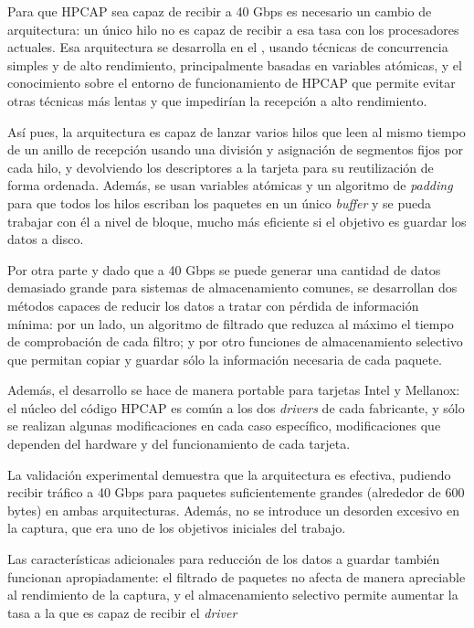 \documentclass[twoside, 12pt, draft]{epstfg}
\begin{document}
Para que HPCAP sea capaz de recibir a 40 Gbps es necesario un cambio de arquitectura: un único hilo no es capaz de recibir a esa tasa con los procesadores actuales. Esa arquitectura se desarrolla en el , usando técnicas de concurrencia simples y de alto rendimiento, principalmente basadas en variables atómicas, y el conocimiento sobre el entorno de funcionamiento de HPCAP que permite evitar otras técnicas más lentas y que impedirían la recepción a alto rendimiento.

Así pues, la arquitectura es capaz de lanzar varios hilos que leen al mismo tiempo de un anillo de recepción usando una división y asignación de segmentos fijos por cada hilo, y devolviendo los descriptores a la tarjeta para su reutilización de forma ordenada. Además, se usan variables atómicas y un algoritmo de \textit{padding} para que todos los hilos escriban los paquetes en un único \textit{buffer} y se pueda trabajar con él a nivel de bloque, mucho más eficiente si el objetivo es guardar los datos a disco.

Por otra parte y dado que a 40 Gbps se puede generar una cantidad de datos demasiado grande para sistemas de almacenamiento comunes, se desarrollan dos métodos capaces de reducir los datos a tratar con pérdida de información mínima: por un lado, un algoritmo de filtrado que reduzca al máximo el tiempo de comprobación de cada filtro; y por otro funciones de almacenamiento selectivo que permitan copiar y guardar sólo la información necesaria de cada paquete.

Además, el desarrollo se hace de manera portable para tarjetas Intel y Mellanox: el núcleo del código HPCAP es común a los dos \textit{drivers} de cada fabricante, y sólo se realizan algunas modificaciones en cada caso específico, modificaciones que dependen del hardware y del funcionamiento de cada tarjeta.

La validación experimental demuestra que la arquitectura es efectiva, pudiendo recibir tráfico a 40 Gbps para paquetes suficientemente grandes (alrededor de 600 bytes) en ambas arquitecturas. Además, no se introduce un desorden excesivo en la captura, que era uno de los objetivos iniciales del trabajo.

Las características adicionales para reducción de los datos a guardar también funcionan apropiadamente: el filtrado de paquetes no afecta de manera apreciable al rendimiento de la captura, y el almacenamiento selectivo permite aumentar la tasa a la que es capaz de recibir el \textit{driver}
\end{document}
